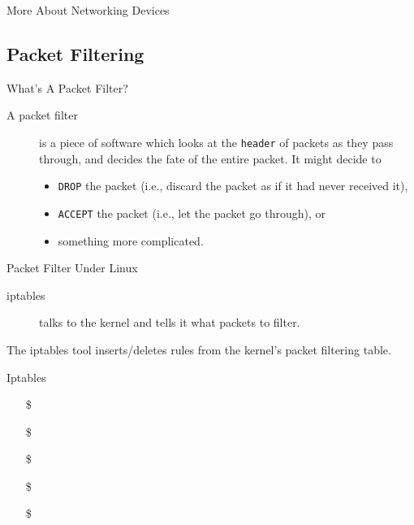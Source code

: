 \begin{frame}{More About Networking Devices}
  \begin{refsection}
    \nocite{wiki:router, wiki:routingtable, wiki:switch, wiki:lanswitching,}
    \printbibliography[heading=none]
  \end{refsection}
\end{frame}

\subsection{Packet Filtering}

\begin{frame}{What's A Packet Filter?}
  \begin{description}
  \item[A packet filter] is a piece of software which looks at the
    \texttt{header} of packets as they pass through, and decides the
    fate of the entire packet. It might decide to
    \begin{itemize}
    \item \texttt{DROP} the packet (i.e., discard the packet as if it
      had never received it),
    \item \texttt{ACCEPT} the packet (i.e., let the packet go
      through), or
    \item something more complicated.
    \end{itemize}
  \end{description}
\end{frame}

\begin{frame}{Packet Filter Under Linux}
  \begin{description}
  \item[iptables] talks to the kernel and tells it what packets to filter.
  \end{description}
  The iptables tool inserts/deletes rules from the kernel's packet filtering table.
\end{frame}

\begin{frame}{Iptables}
  \begin{itemize}
  \item[\$] 
  \item[\$] 
  \item[\$] 
  \item[\$] 
  \item[\$] 
  \end{itemize}
\end{frame}

